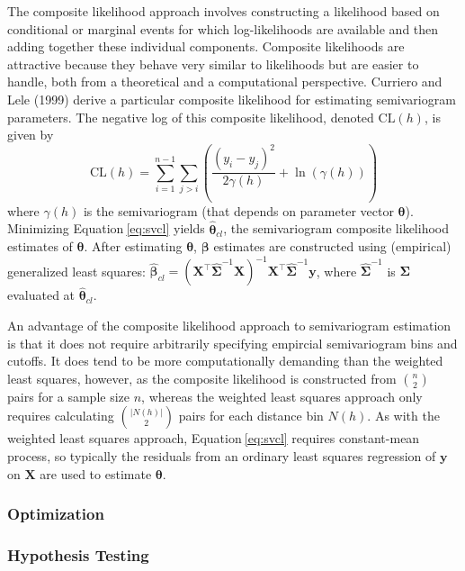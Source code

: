 \documentclass{article}
\begin{document}
The composite likelihood approach involves constructing a likelihood
based on conditional or marginal events for which log-likelihoods are
available and then adding together these individual components.
Composite likelihoods are attractive because they behave very similar to
likelihoods but are easier to handle, both from a theoretical and a
computational perspective. Curriero and Lele (1999) derive a particular
composite likelihood for estimating semivariogram parameters. The
negative log of this composite likelihood, denoted \(\text{CL}(h)\), is
given by \begin{equation}\label{eq:svcl}
  \text{CL}(h) = \sum_{i = 1}^{n - 1} \sum_{j > i} \left( \frac{(y_i - y_j)^2}{2\gamma(h)} + \ln(\gamma(h)) \right)
\end{equation} where \(\gamma(h)\) is the semivariogram (that depends on
parameter vector \(\bm{\theta}\)). Minimizing Equation\(~\)\ref{eq:svcl}
yields \(\bm{\hat{\theta}}_{cl}\), the semivariogram composite
likelihood estimates of \(\bm{\theta}\). After estimating
\(\bm{\theta}\), \(\bm{\beta}\) estimates are constructed using
(empirical) generalized least squares:
\(\bm{\hat{\beta}}_{cl} = (\mathbf{X}^\intercal \hat{\mathbf{\Sigma}}^{-1} \mathbf{X})^{-1} \mathbf{X}^\intercal \hat{\mathbf{\Sigma}}^{-1} \mathbf{y}\),
where \(\hat{\mathbf{\Sigma}}^{-1}\) is \(\mathbf{\Sigma}\) evaluated at
\(\bm{\hat{\theta}}_{cl}\).

An advantage of the composite likelihood approach to semivariogram
estimation is that it does not require arbitrarily specifying empircial
semivariogram bins and cutoffs. It does tend to be more computationally
demanding than the weighted least squares, however, as the composite
likelihood is constructed from \(\binom{n}{2}\) pairs for a sample size
\(n\), whereas the weighted least squares approach only requires
calculating \(\binom{|N(h)|}{2}\) pairs for each distance bin \(N(h)\).
As with the weighted least squares approach, Equation\(~\)\ref{eq:svcl}
requires constant-mean process, so typically the residuals from an
ordinary least squares regression of \(\mathbf{y}\) on \(\mathbf{X}\)
are used to estimate \(\bm{\theta}\).

\hypertarget{optimization}{%
\subsubsection{Optimization}\label{optimization}}

\hypertarget{hypothesis-testing}{%
\subsubsection{Hypothesis Testing}\label{hypothesis-testing}}
\end{document}
